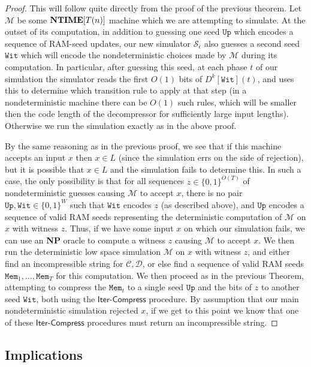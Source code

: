 \documentclass[11pt]{article}
\newcommand{\dash}{\text{-}}
\newcommand{\B}{\{0,1\}}
\def\cl{\bf}
\begin{document}
\begin{proof}
This will follow quite directly from the proof of the previous theorem. Let $\mathcal{M}$ be some ${\cl NTIME}[T(n)]$ machine which we are attempting to simulate. At the outset of its computation, in addition to guessing one seed $\mathtt{Up}$ which encodes a sequence of RAM-seed updates, our new simulator $\mathcal{S}_{\epsilon}$ also guesses a second seed $\mathtt{Wit}$ which will encode the nondeterministic choices made by $\mathcal{M}$ during its computation. In particular, after guessing this seed, at each phase $t$ of our simulation the simulator reads the first $O(1)$ bits of $D^k[\mathtt{Wit}](t)$, and uses this to determine which transition rule to apply at that step (in a nondeterministic machine there can be $O(1)$ such rules, which will be smaller then the code length of the decompressor for sufficiently large input lengths). Otherwise we run the simulation exactly as in the above proof.

By the same reasoning as in the previous proof, we see that if this machine accepts an input $x$ then $x \in L$ (since the simulation errs on the side of rejection), but it is possible that $x \in L$ and the simulation fails to determine this. In such a case, the only possibility is that for all sequences $z \in \B^{O(T)}$ of nondeterministic guesses causing $\mathcal{M}$ to accept $x$, there is no pair $\mathtt{Up},\mathtt{Wit} \in \B^W$ such that $\mathtt{Wit}$ encodes $z$ (as described above), and $\mathtt{Up}$ encodes a sequence of valid RAM seeds representing the deterministic computation of $\mathcal{M}$ on $x$ with witness $z$. Thus, if we have some input $x$ on which our simulation fails, we can use an {\cl NP} oracle to compute a witness $z$ causing $\mathcal{M}$ to accept $x$. We then run the deterministic low space simulation $\mathcal{M}$ on $x$ with witness $z$, and either find an incompressible string for $\mathcal{C},\mathcal{D}$, or else find a sequence of valid RAM seeds $\mathtt{Mem}_1,\ldots,\mathtt{Mem}_T$ for this computation. We then proceed as in the previous Theorem, attempting to compress the $\mathtt{Mem}_t$ to a single seed $\mathtt{Up}$ and the bits of $z$ to another seed $\mathtt{Wit}$, both using the $\mathsf{Iter\dash Compress}$ procedure. By assumption that our main nondeterministic simulation rejected $x$, if we get to this point we know that one of these $\mathsf{Iter\dash Compress}$ procedures must return an incompressible string. 
\end{proof}


\subsection{Implications}\label{subsec:implications}
\end{document}
